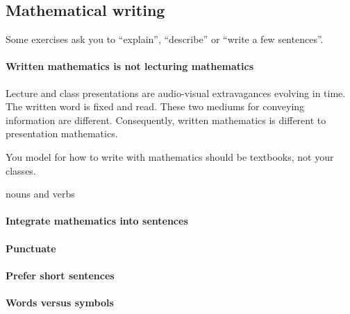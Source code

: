 \begin{draft}
\section{Mathematical writing}
\label{sec:write}
\secttoc

\begin{comment}
\cite{Higham98} Chapters 3 and~4: dos and don'ts; etc.
\cite{Zobel04}
\end{comment}

Some exercises ask you to ``explain'', ``describe'' or ``write a few sentences''.

\paragraph{Written mathematics is not lecturing mathematics}
Lecture and class presentations are audio-visual extravagances evolving in time.
The written word is fixed and read.
These two mediums for conveying information are different.
Consequently, written mathematics is different to presentation mathematics.

You model for how to write with mathematics should be textbooks, not your classes.



nouns and verbs



\paragraph{Integrate mathematics into sentences}



\paragraph{Punctuate}



\paragraph{Prefer short sentences}



\paragraph{Words versus symbols}




\end{draft}
